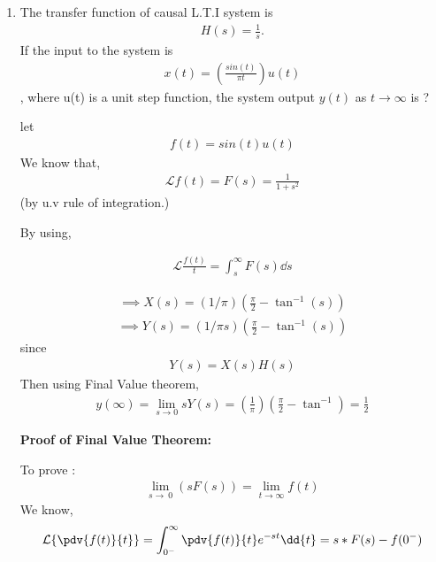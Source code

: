 \begin{enumerate}[label=\thesection.\arabic*.,ref=\thesection.\theenumi]
\item The transfer function of causal L.T.I system is 
\begin{align}
H(s) = \frac{1}{s}. 
\end{align}If the input to the system is 
\begin{align}
x(t) = (\frac{sin(t)}{\pi t})u(t)
\end{align}
, where u(t) is a unit step function, the system output 
$y(t)$ as $t \to \infty$  is ?

\solution
let
\begin{align}
    f(t) = sin(t)u(t)
\end{align}
We know that, 
\begin{align}
\mathcal{L}{f(t)} = F(s) = \frac{1}{1 + s^2} 
\end{align}
    (by u.v rule of integration.)

By using,  

\begin{align}
  \mathcal{L}{\frac{f(t)}{t}} = \int_{s}^{\infty}F(s) \dd{s} 
\end{align}

\begin{align}
\implies X(s) = (1/ \pi)( \frac{\pi}{2} - \tan^{-1}(s))
\end{align}
\begin{align}
\implies Y(s) = (1/ \pi s) ( \frac{\pi}{2} - \tan^{-1}(s)) 
\end{align}
since 
\begin{align}
Y(s) = X(s)H(s)
\end{align}
Then using Final Value theorem,
\begin{align}
y(\infty) = \lim_{s\to 0} sY(s) =(\frac{1}{\pi}) ( \frac{\pi}{2} - \tan^{-1}) = \frac{1}{2}
\end{align}





\textbf{ Proof of Final Value Theorem:}

To prove : 
\begin{align}
 \lim_{s\to\ 0} (sF(s)) = \lim_{t\to\infty} f(t)
\end{align}
We know,
\begin{align}
\mathcal{L}\{\pdv{f(t)}{t}\} = \int_{0^-}^{\infty} \pdv{f(t)}{t} e^{-st}\dd{t} =s*F(s)-f(0^{-})
\end{align}


\end{enumerate}
